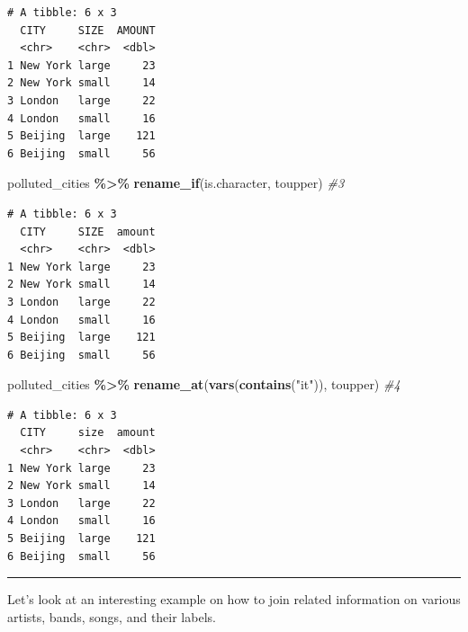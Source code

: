 \documentclass[
]{book}
\newenvironment{Shaded}{\begin{snugshade}}{\end{snugshade}}
\newcommand{\CommentTok}[1]{\textcolor[rgb]{0.56,0.35,0.01}{\textit{#1}}}
\newcommand{\FunctionTok}[1]{\textcolor[rgb]{0.13,0.29,0.53}{\textbf{#1}}}
\newcommand{\NormalTok}[1]{#1}
\newcommand{\SpecialCharTok}[1]{\textcolor[rgb]{0.81,0.36,0.00}{\textbf{#1}}}
\newcommand{\StringTok}[1]{\textcolor[rgb]{0.31,0.60,0.02}{#1}}
\begin{document}
\begin{verbatim}
# A tibble: 6 x 3
  CITY     SIZE  AMOUNT
  <chr>    <chr>  <dbl>
1 New York large     23
2 New York small     14
3 London   large     22
4 London   small     16
5 Beijing  large    121
6 Beijing  small     56
\end{verbatim}

\begin{Shaded}
\begin{Highlighting}[]
\NormalTok{polluted\_cities }\SpecialCharTok{\%\textgreater{}\%} \FunctionTok{rename\_if}\NormalTok{(is.character, toupper) }\CommentTok{\#3}
\end{Highlighting}
\end{Shaded}

\begin{verbatim}
# A tibble: 6 x 3
  CITY     SIZE  amount
  <chr>    <chr>  <dbl>
1 New York large     23
2 New York small     14
3 London   large     22
4 London   small     16
5 Beijing  large    121
6 Beijing  small     56
\end{verbatim}

\begin{Shaded}
\begin{Highlighting}[]
\NormalTok{polluted\_cities }\SpecialCharTok{\%\textgreater{}\%} \FunctionTok{rename\_at}\NormalTok{(}\FunctionTok{vars}\NormalTok{(}\FunctionTok{contains}\NormalTok{(}\StringTok{"it"}\NormalTok{)), toupper) }\CommentTok{\#4}
\end{Highlighting}
\end{Shaded}

\begin{verbatim}
# A tibble: 6 x 3
  CITY     size  amount
  <chr>    <chr>  <dbl>
1 New York large     23
2 New York small     14
3 London   large     22
4 London   small     16
5 Beijing  large    121
6 Beijing  small     56
\end{verbatim}

\begin{center}\rule{0.5\linewidth}{0.5pt}\end{center}

Let's look at an interesting example on how to join related information on various artists, bands, songs, and their labels.
\end{document}
